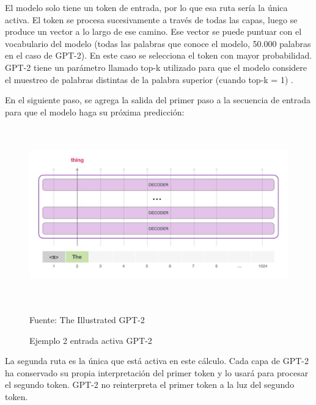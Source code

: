 \documentclass[../Main.tex]{subfiles}
\begin{document}
     
    
    \begin{justify}
     El modelo solo tiene un token de entrada, por lo que esa ruta sería la única activa. El token se procesa sucesivamente a través de todas las capas, luego se produce un vector a lo largo de ese camino. Ese vector se puede puntuar con el vocabulario del modelo (todas las palabras que conoce el modelo, 50.000 palabras en el caso de GPT-2). En este caso se selecciona el token con mayor probabilidad. GPT-2 tiene un parámetro llamado top-k utilizado para que el modelo considere el muestreo de palabras distintas de la palabra superior (cuando top-k = 1) \cite{46}.
     
     En el siguiente paso, se agrega la salida del primer paso a la secuencia de entrada para que el modelo haga su próxima predicción:
    \end{justify}
    
    \begin{figure}[H]
	\begin{Center}
		\includegraphics[width=6in,height=3in]{Chapters/04ChapterModelamiento/images/gpt-2-layers-input-2.png}
	    \caption{Ejemplo 2 entrada activa GPT-2}
	    Fuente: The Illustrated GPT-2 \cite{46}
        \label{fig:section}
	\end{Center}
    \end{figure}
    
    \begin{justify}
    La segunda ruta es la única que está activa en este cálculo. Cada capa de GPT-2 ha conservado su propia interpretación del primer token y lo usará para procesar el segundo token. GPT-2 no reinterpreta el primer token a la luz del segundo token.
    \end{justify}
\end{document}

